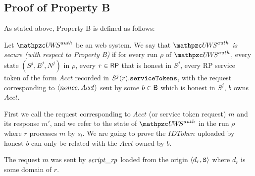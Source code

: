 \begin{theorem}
  \subsection{Proof of Property B}
  As stated above, Property B is defined as follows:
  \begin{definition}\label{def:B}
    Let $\uppressoauthwebsystem$ be an \uppresso web system. We say that
    \emph{$\uppressoauthwebsystem$ is secure (with respect to Property B)} if
    for every run $\rho$ of $\uppressoauthwebsystem$, every state $(S^j, E^j, N^j)$
    in $\rho$, every $r\in \mathsf{RP}$ that is honest in $S^j$, 
    every RP service token of the form $Acct$ recorded in
    $S^j(r).\mathtt{serviceTokens}$, with the request corresponding to
    $\langle {{}nonce, Acct} \rangle$ sent by some $b\in \mathsf{B}$ which is honest in $S^j$, $b$ owns $Acct$.
  \end{definition}
  
  First we call the request corresponding to $Acct$ (or service token request) $m$ and
  its response $m'$, and we refer to the state of $\uppressoauthwebsystem$ in the run 
  $\rho$ where $r$ processes $m$ by $s_l$. We are going to prove the $IDToken$ uploaded 
  by honest $b$ can only be related with the $Acct$ owned by $b$.
  
  
  \begin{lemma}\label{lemma:request-m-is-from-script-rp}
    The request $m$ was sent by $\mathit{script\_rp}$ loaded from 
    the origin $\langle d_r, \mathtt{S}\rangle$ where $d_r$ is some domain of 
    $r$.
  \end{lemma}
  

\end{theorem}
